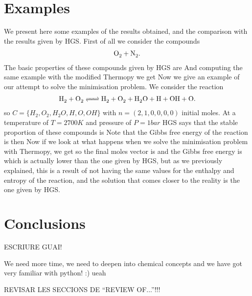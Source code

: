 \documentclass[a4paper,10pt]{article}
\theoremstyle{plain}
\theoremstyle{definition}
\theoremstyle{remark}
\newcommand{\quotes}[1]{``#1''}
\begin{document}
\section{Examples}
We present here some examples of the results obtained, and the comparison with the results given by HGS. First of all we consider the compounds 
\begin{align}
\cee{O2 + N2}.
\end{align}
The basic properties of these compounds given by HGS are
And computing the same example with the modified Thermopy we get
Now we give an example of our attempt to solve the minimisation problem. We consider the reaction
\begin{align}
\cee{H2 + O2 <=> H2 + O2 + H2O + H + OH + O}.
\end{align}
so $C = \{H_2,O_2, H_2O, H, O, OH\}$ with $n = (2,1,0,0,0,0)$ initial moles. At a temperature of $T = 2700K$ and pressure of $P = 1bar$ HGS says that the stable proportion of these compounds is
Note that the Gibbs free energy of the reaction is then %
Now if we look at what happens when we solve the minimisation problem with Thermopy, we get
so the final moles vector is %
and the Gibbs free energy is %
which is actually lower than the one given by HGS, but as we previously explained, this is a result of not having the same values for the enthalpy and entropy of the reaction, and the solution that comes closer to the reality is the one given by HGS.
\section{Conclusions}
{\color{red}ESCRIURE GUAI!

We need more time, we need to deepen into chemical concepts and we have got very familiar with python! :) ueah

REVISAR LES SECCIONS DE \quotes{REVIEW OF...}!!!}
\end{document}
